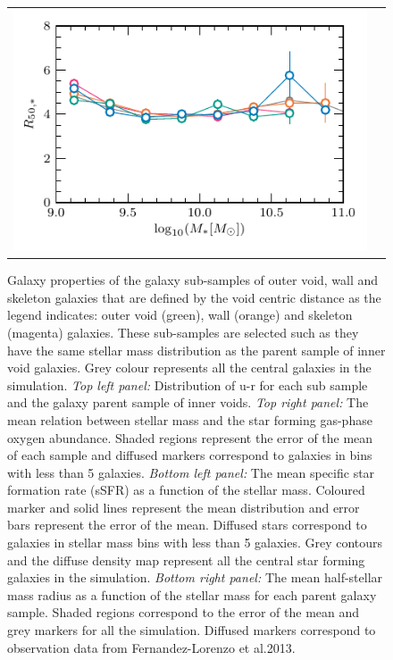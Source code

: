 \documentclass[a4paper,fleqn,usenatbib,letter]{mnras}
\begin{document}
\begin{figure}
\begin{tabular}{cc}
	\includegraphics[width=1\columnwidth]{plots_stellarmass_central/mass_sizes_threeregions_PTcalsReff.pdf} \\	
	
	\end{tabular}	
    \caption{Galaxy properties of the galaxy sub-samples of outer void, wall and skeleton galaxies that are defined by the void centric distance as the legend indicates: outer void (green), wall (orange) and skeleton (magenta) galaxies. These sub-samples are selected such as they have the same stellar mass distribution as the parent sample of inner void galaxies. Grey colour represents all the central galaxies in the simulation. \textit{Top left panel:} Distribution of u-r for each sub sample and the galaxy parent sample of inner voids. \textit{ Top right panel:} The mean relation between stellar mass  and the star forming gas-phase  oxygen abundance.  Shaded regions represent the error of the mean of each sample and diffused markers correspond to galaxies in bins with less than 5 galaxies. \textit{ Bottom left panel:} The mean specific star formation rate (sSFR) as a function of the stellar mass. Coloured marker and solid lines represent the mean distribution and error bars represent the error of the mean. Diffused  stars correspond to galaxies in stellar mass bins with less than 5 galaxies. Grey contours and the diffuse density map represent all the central star forming  galaxies in the simulation. \textit{Bottom right panel:} The mean half-stellar mass radius as a function of the stellar mass for each parent galaxy sample. Shaded regions correspond to the error of the mean and grey markers for all the simulation. Diffused markers correspond to observation data from  Fernandez-Lorenzo et al.2013. }
    \label{fig:samestellarmass}
\end{figure}
\end{document}
